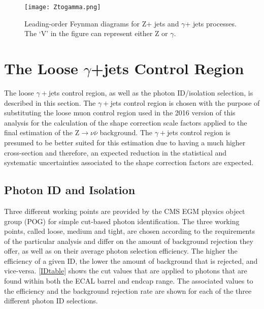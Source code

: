 \begin{figure}[H]
\begin{center}
\texttt{[image: Ztogamma.png]}
\end{center}
\vspace{-1em}
\caption[Leading-order Feynman diagrams for Z+ jets and $\gamma$+ jets processes.]{Leading-order Feynman diagrams for Z+ jets and $\gamma$+ jets processes. The `V' in the figure can represent either Z or $\gamma$.}
\label{Ztogamma}
\end{figure}

\section{The Loose $\gamma$+jets Control Region}

The loose $\gamma+$jets control region, as well as the photon ID/isolation selection, is described in this section. The $\gamma+$jets control region is chosen with the purpose of substituting the loose muon control region used in the 2016 version of this analysis for the calculation of the shape correction scale factors applied to the final estimation of the Z$\rightarrow\nu\bar{\nu}$ background. The $\gamma+$jets control region is presumed to be better suited for this estimation due to having a much higher cross-section and therefore, an expected reduction in the statistical and systematic uncertainties associated to the shape correction factors are expected. 

\subsection{Photon ID and Isolation}\label{photonID}

Three different working points are provided by the CMS EGM physics object group (POG) for simple cut-based photon identification\cite{photonID}. The three working points, called loose, medium and tight, are chosen according to the requirements of the particular analysis and differ on the amount of background rejection they offer, as well as on their average photon selection efficiency. The higher the efficiency of a given ID, the lower the amount of background that is rejected, and vice-versa. \autoref{IDtable} shows the cut values that are applied to photons that are found within both the ECAL barrel and endcap range. The associated values to the efficiency and the background rejection rate are shown for each of the three different photon ID selections.\\

